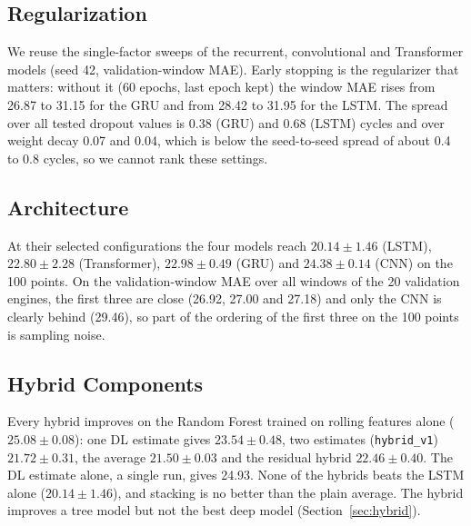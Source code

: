 \subsection{Regularization}
We reuse the single-factor sweeps of the recurrent, convolutional and Transformer models (seed 42, validation-window MAE).  Early stopping is the regularizer that matters: without it (60 epochs, last epoch kept) the window MAE rises from 26.87 to 31.15 for the GRU and from 28.42 to 31.95 for the LSTM.  The spread over all tested dropout values is 0.38 (GRU) and 0.68 (LSTM) cycles and over weight decay 0.07 and 0.04, which is below the seed-to-seed spread of about 0.4 to 0.8 cycles, so we cannot rank these settings.

\subsection{Architecture}
At their selected configurations the four models reach $20.14\pm1.46$ (LSTM), $22.80\pm2.28$ (Transformer), $22.98\pm0.49$ (GRU) and $24.38\pm0.14$ (CNN) on the 100 points.  On the validation-window MAE over all windows of the 20 validation engines, the first three are close (26.92, 27.00 and 27.18) and only the CNN is clearly behind (29.46), so part of the ordering of the first three on the 100 points is sampling noise.

\subsection{Hybrid Components}
Every hybrid improves on the Random Forest trained on rolling features alone ($25.08\pm0.08$): one DL estimate gives $23.54\pm0.48$, two estimates (\texttt{hybrid\_v1}) $21.72\pm0.31$, the average $21.50\pm0.03$ and the residual hybrid $22.46\pm0.40$.  The DL estimate alone, a single run, gives 24.93.  None of the hybrids beats the LSTM alone ($20.14\pm1.46$), and stacking is no better than the plain average.  The hybrid improves a tree model but not the best deep model (Section~\ref{sec:hybrid}).
